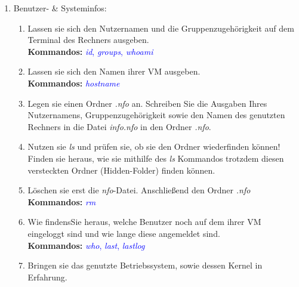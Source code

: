 \documentclass[paper=a4,fontsize=11pt]{scrartcl}%
\numberwithin{equation}{section}
\begin{document}
\begin{enumerate}
\begin{enumerate}[label=(\alph*)]
		\item Kopieren sie die Datei bzw. den Ordner \emph{shell\_tutorial} in das eben angelegte Verzeichnis.\\
		\textbf{Kommandos:} \textcolor{blue}{\emph{cp} }
        \item Kopieren sie die Datei(en) inklusive des Ordners  in das Verzeichnis .\\
        \textbf{Hinweise:} Schauen sie in die Manpage von \emph{cp} um herauszufinden, wie Ordner kopiert werden können.\\
        \textbf{Kommandos:} \textcolor{blue}{\emph{man cp}}
  	\end{enumerate}
  	\footnote{.md steht für Markdown, welches ein Format für Textdateien ist, ähnlich wie .pdf oder .doc-Dateien.}
\newpage        
         \item Benutzer- \& Systeminfos:
    		\begin{enumerate} [label=(\alph*)]
          \item Lassen sie sich den Nutzernamen und die Gruppenzugehörigkeit auf dem Terminal des Rechners ausgeben.\\
          \textbf{Kommandos:} \textcolor{blue}{\emph{id}, \emph{groups}, \emph{whoami}}
          \item Lassen sie sich den Namen ihrer VM ausgeben.\\
          \textbf{Kommandos:} \textcolor{blue}{\emph{hostname}}
          \item Legen sie einen Ordner \emph{.nfo} an. Schreiben Sie die Ausgaben Ihres Nutzernamens, Gruppenzugehörigkeit sowie den Namen des genutzten Rechners in die Datei \emph{info.nfo} in den Ordner \emph{.nfo}.
          \item Nutzen sie \emph{ls} und prüfen sie, ob sie den Ordner wiederfinden können! Finden sie heraus, wie sie mithilfe des \emph{ls} Kommandos trotzdem diesen versteckten Ordner (Hidden-Folder) finden können.
          \item Löschen sie erst die \emph{nfo}-Datei. Anschließend den Ordner \emph{.nfo}\\
          \textbf{Kommandos:} \textcolor{blue}{\emph{rm}}
          \item Wie findensSie heraus, welche Benutzer noch auf dem ihrer VM eingeloggt sind und wie lange diese angemeldet sind.\\
          \textbf{Kommandos:} \textcolor{blue}{\emph{who}, \emph{last}, \emph{lastlog}}
          \item Bringen sie das genutzte Betriebssystem, sowie dessen Kernel in Erfahrung.\\

\end{enumerate}
\end{enumerate}
\end{document}

